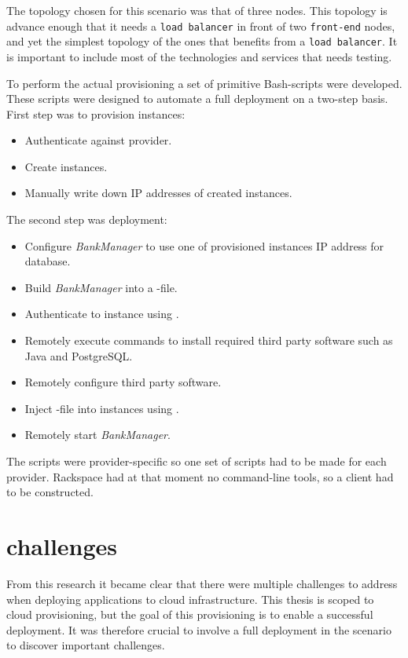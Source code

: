 The topology chosen for this scenario was that of three nodes.
This topology is advance enough that it needs a \texttt{load balancer} in front of two
\texttt{front-end} nodes, and yet the simplest topology of the ones that benefits from a \texttt{load balancer}.
It is important to include most of the technologies and services that needs testing.

To perform the actual provisioning a set of primitive Bash-scripts were developed.
These scripts were designed to automate a full deployment on a two-step basis.
First step was to provision instances:
\begin{itemize}
  \item Authenticate against provider.
  \item Create instances.
  \item Manually write down IP addresses of created instances.
\end{itemize}
The second step was deployment:
\begin{itemize}
  \item Configure \emph{BankManager} to use one of provisioned instances IP address for database.
  \item Build \emph{BankManager} into a -file.
  \item Authenticate to instance using .
  \item Remotely execute commands to install required third party software such as Java and PostgreSQL.
  \item Remotely configure third party software.
  \item Inject -file into instances using .
  \item Remotely start \emph{BankManager}.
\end{itemize}
The scripts were provider-specific so one set of scripts had to be made for each provider.
Rackspace had at that moment no command-line tools, so a  client had to be constructed.

\section{challenges}

From this research it became clear that there were multiple challenges to address
when deploying applications to cloud infrastructure.
This thesis is scoped to cloud provisioning, but the goal of this provisioning is to 
enable a successful deployment. 
It was therefore crucial to involve a full deployment in the scenario to discover
important challenges.

